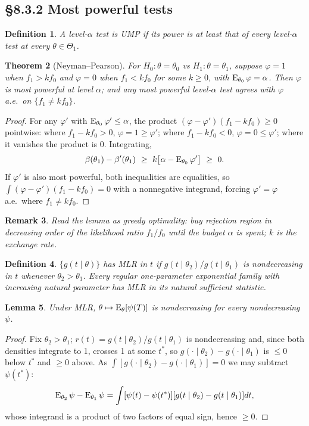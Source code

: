 \documentclass[11pt]{article}
\newtheorem{theorem}{Theorem}[section]
\newtheorem{definition}[theorem]{Definition}
\newtheorem{remark}[theorem]{Remark}
\newtheorem{lemma}[theorem]{Lemma}
\begin{document}
\subsection{\S8.3.2 Most powerful tests}
\begin{definition}
A level-$\alpha$ test is UMP if its power is at least that of every level-$\alpha$ test at every $\theta\in\Theta_1$.
\end{definition}
\begin{theorem}[Neyman--Pearson]
For $H_0:\theta=\theta_0$ vs $H_1:\theta=\theta_1$, suppose $\varphi=1$ when $f_1>kf_0$ and $\varphi=0$ when $f_1<kf_0$ for some $k\ge0$, with $\operatorname{E}_{\theta_0}\varphi=\alpha$. Then $\varphi$ is most powerful at level $\alpha$; and any most powerful level-$\alpha$ test agrees with $\varphi$ a.e.\ on $\{f_1\ne kf_0\}$.
\end{theorem}
\begin{proof}
For any $\varphi'$ with $\operatorname{E}_{\theta_0}\varphi'\le\alpha$, the product $(\varphi-\varphi')(f_1-kf_0)\ge0$ pointwise: where $f_1-kf_0>0$, $\varphi=1\ge\varphi'$; where $f_1-kf_0<0$, $\varphi=0\le\varphi'$; where it vanishes the product is $0$. Integrating,
\[\beta(\theta_1)-\beta'(\theta_1)\ \ge\ k\big[\alpha-\E_{\theta_0}\varphi'\big]\ \ge\ 0 .\]
If $\varphi'$ is also most powerful, both inequalities are equalities, so $\int(\varphi-\varphi')(f_1-kf_0)=0$ with a nonnegative integrand, forcing $\varphi'=\varphi$ a.e.\ where $f_1\ne kf_0$.
\end{proof}
\begin{remark}
Read the lemma as greedy optimality: buy rejection region in decreasing order of the likelihood ratio $f_1/f_0$ until the budget $\alpha$ is spent; $k$ is the exchange rate.
\end{remark}
\begin{definition}
$\{g(t\mid\theta)\}$ has MLR in $t$ if $g(t\mid\theta_2)/g(t\mid\theta_1)$ is nondecreasing in $t$ whenever $\theta_2>\theta_1$. Every regular one-parameter exponential family with increasing natural parameter has MLR in its natural sufficient statistic.
\end{definition}
\begin{lemma}
Under MLR, $\theta\mapsto\operatorname{E}_\theta[\psi(T)]$ is nondecreasing for every nondecreasing $\psi$.
\end{lemma}
\begin{proof}
Fix $\theta_2>\theta_1$; $r(t)=g(t\mid\theta_2)/g(t\mid\theta_1)$ is nondecreasing and, since both densities integrate to 1, crosses 1 at some $t^*$, so $g(\cdot\mid\theta_2)-g(\cdot\mid\theta_1)$ is $\le0$ below $t^*$ and $\ge0$ above. As $\int[g(\cdot\mid\theta_2)-g(\cdot\mid\theta_1)]=0$ we may subtract $\psi(t^*)$:
\[\operatorname{E}_{\theta_2}\psi-\operatorname{E}_{\theta_1}\psi=\int[\psi(t)-\psi(t^*)][g(t\mid\theta_2)-g(t\mid\theta_1)]dt,\]
whose integrand is a product of two factors of equal sign, hence $\ge0$.
\end{proof}
\end{document}
